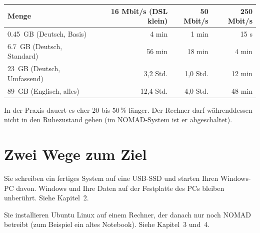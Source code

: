\begin{center}\small
\begin{tabular}{@{}lrrr@{}}
\toprule
\textbf{Menge} & \textbf{16 Mbit/s (DSL klein)} & \textbf{50 Mbit/s} & \textbf{250 Mbit/s} \\
\midrule
\SI{0,45}{GB} (Deutsch, Basis) & 4 min & 1 min & 15 s \\
\SI{6,7}{GB} (Deutsch, Standard) & 56 min & 18 min & 4 min \\
\SI{23}{GB} (Deutsch, Umfassend) & 3,2 Std. & 1,0 Std. & 12 min \\
\SI{89}{GB} (Englisch, alles) & 12,4 Std. & 4,0 Std. & 48 min \\
\bottomrule
\end{tabular}
\end{center}
In der Praxis dauert es eher 20 bis 50\,\% länger. Der Rechner darf währenddessen nicht in den Ruhezustand gehen (im NOMAD-System ist er abgeschaltet).

\section{Zwei Wege zum Ziel}
\begin{description}[leftmargin=1.2em,style=nextline]
\item[Weg 2 – USB-SSD (empfohlen)] Sie schreiben ein fertiges System auf eine USB-SSD und starten Ihren Windows-PC davon. Windows und Ihre Daten auf der Festplatte des PCs bleiben unberührt. Siehe Kapitel~2.
\item[Weg 1 – eigener Rechner mit Ubuntu] Sie installieren Ubuntu Linux auf einem Rechner, der danach nur noch NOMAD betreibt (zum Beispiel ein altes Notebook). Siehe Kapitel~3 und~4.
\end{description}
